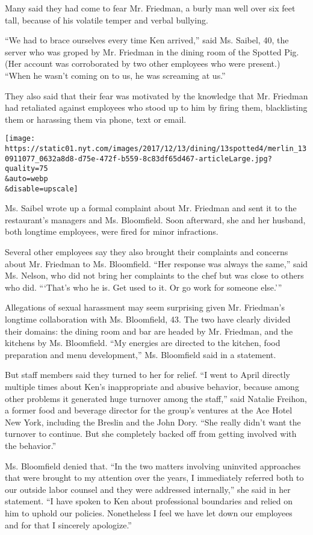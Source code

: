 Many said they had come to fear Mr. Friedman, a burly man well over six
feet tall, because of his volatile temper and verbal bullying.

``We had to brace ourselves every time Ken arrived,'' said Ms. Saibel,
40, the server who was groped by Mr. Friedman in the dining room of the
Spotted Pig. (Her account was corroborated by two other employees who
were present.) ``When he wasn't coming on to us, he was screaming at
us.''

They also said that their fear was motivated by the knowledge that Mr.
Friedman had retaliated against employees who stood up to him by firing
them, blacklisting them or harassing them via phone, text or email.

\texttt{[image: https://static01.nyt.com/images/2017/12/13/dining/13spotted4/merlin\_130911077\_0632a8d8-d75e-472f-b559-8c83df65d467-articleLarge.jpg?quality=75\\\&auto=webp\\\&disable=upscale]}

Ms. Saibel wrote up a formal complaint about Mr. Friedman and sent it to
the restaurant's managers and Ms. Bloomfield. Soon afterward, she and
her husband, both longtime employees, were fired for minor infractions.

Several other employees say they also brought their complaints and
concerns about Mr. Friedman to Ms. Bloomfield. ``Her response was always
the same,'' said Ms. Nelson, who did not bring her complaints to the
chef but was close to others who did. ```That's who he is. Get used to
it. Or go work for someone else.'''

Allegations of sexual harassment may seem surprising given Mr.
Friedman's longtime collaboration with Ms. Bloomfield, 43. The two have
clearly divided their domains: the dining room and bar are headed by Mr.
Friedman, and the kitchens by Ms. Bloomfield. ``My energies are directed
to the kitchen, food preparation and menu development,'' Ms. Bloomfield
said in a statement.

But staff members said they turned to her for relief. ``I went to April
directly multiple times about Ken's inappropriate and abusive behavior,
because among other problems it generated huge turnover among the
staff,'' said Natalie Freihon, a former food and beverage director for
the group's ventures at the Ace Hotel New York, including the Breslin
and the John Dory. ``She really didn't want the turnover to continue.
But she completely backed off from getting involved with the behavior.''

Ms. Bloomfield denied that. ``In the two matters involving uninvited
approaches that were brought to my attention over the years, I
immediately referred both to our outside labor counsel and they were
addressed internally,'' she said in her statement. ``I have spoken to
Ken about professional boundaries and relied on him to uphold our
policies. Nonetheless I feel we have let down our employees and for that
I sincerely apologize.''

